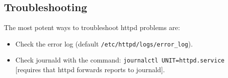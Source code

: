 \subsection{Troubleshooting}
The most potent ways to troubleshoot httpd problems are:
\begin{itemize}
	\item Check the error log (default \verb|/etc/httpd/logs/error_log|).
	\item Check journald with the command: \verb|journalctl UNIT=httpd.service| [requires that httpd forwards reports to journald]. 
\end{itemize}